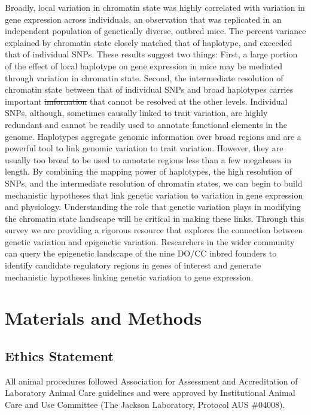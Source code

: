 \documentclass[
  11pt,
]{article}
\providecommand{\DIFaddtex}[1]{{\protect\color{blue}\uwave{#1}}} %
\providecommand{\DIFdeltex}[1]{{\protect\color{red}\sout{#1}}}                      %
\providecommand{\DIFaddbegin}{} %
\providecommand{\DIFaddend}{} %
\providecommand{\DIFdelbegin}{} %
\providecommand{\DIFdelend}{} %
\providecommand{\DIFadd}[1]{\texorpdfstring{\DIFaddtex{#1}}{#1}} %
\providecommand{\DIFdel}[1]{\texorpdfstring{\DIFdeltex{#1}}{}} %
\newcommand{\DIFscaledelfig}{0.5}
\newlength{\DIFdelgraphicswidth} %
\newlength{\DIFdelgraphicsheight} %
\newcommand{\DIFaddincludegraphics}[2][]{{\color{blue}\fbox{\DIFOincludegraphics[#1]{#2}}}} %
\newcommand{\DIFdelincludegraphics}[2][]{%
\sbox{\DIFdelgraphicsbox}{\DIFOincludegraphics[#1]{#2}}%
\settoboxwidth{\DIFdelgraphicswidth}{\DIFdelgraphicsbox} %
\settoboxtotalheight{\DIFdelgraphicsheight}{\DIFdelgraphicsbox} %
\scalebox{\DIFscaledelfig}{%
\parbox[b]{\DIFdelgraphicswidth}{\usebox{\DIFdelgraphicsbox}\\[-\baselineskip] \rule{\DIFdelgraphicswidth}{0em}}\llap{\resizebox{\DIFdelgraphicswidth}{\DIFdelgraphicsheight}{%
\setlength{\unitlength}{\DIFdelgraphicswidth}%
\begin{picture}(1,1)%
\thicklines\linethickness{2pt} %
{\color[rgb]{1,0,0}\put(0,0){\framebox(1,1){}}}%
{\color[rgb]{1,0,0}\put(0,0){\line( 1,1){1}}}%
{\color[rgb]{1,0,0}\put(0,1){\line(1,-1){1}}}%
\end{picture}%
}\hspace*{3pt}}} %
} %
\DeclareRobustCommand{\DIFaddbegin}{\DIFOaddbegin \let\includegraphics\DIFaddincludegraphics} %
\DeclareRobustCommand{\DIFaddend}{\DIFOaddend \let\includegraphics\DIFOincludegraphics} %
\DeclareRobustCommand{\DIFdelbegin}{\DIFOdelbegin \let\includegraphics\DIFdelincludegraphics} %
\DeclareRobustCommand{\DIFdelend}{\DIFOaddend \let\includegraphics\DIFOincludegraphics} %
\begin{document}
Broadly, local variation in chromatin state was highly correlated with
variation in gene expression across individuals, an observation that was
replicated in an independent population of genetically diverse, outbred
mice. The percent variance explained by chromatin state closely matched
that of haplotype, and exceeded that of individual SNPs. These results
suggest two things: First, a large portion of the effect of local
haplotype on gene expression in mice may be mediated through variation
in chromatin state. Second, the intermediate resolution of chromatin
state between that of individual SNPs and broad haplotypes carries
important \DIFdelbegin \DIFdel{imfornation }\DIFdelend \DIFaddbegin \DIFadd{infornation }\DIFaddend that cannot be resolved at the other levels.
Individual SNPs, although, sometimes causally linked to trait variation,
are highly redundant and cannot be readily used to annotate functional
elements in the genome. Haplotypes aggregate genomic information over
broad regions and are a powerful tool to link genomic variation to trait
variation. However, they are usually too broad to be used to annotate
regions less than a few megabases in length. By combining the mapping
power of haplotypes, the high resolution of SNPs, and the intermediate
resolution of chromatin states, we can begin to build mechanistic
hypotheses that link genetic variation to variation in gene expression
and physiology. Understanding the role that genetic variation plays in
modifying the chromatin state landscape will be critical in making these
links. Through this survey we are providing a rigorous resource that
explores the connection between genetic variation and epigenetic
variation. Researchers in the wider community can query the epigenetic
landscape of the nine DO/CC inbred founders to identify candidate
regulatory regions in genes of interest and generate mechanistic
hypotheses linking genetic variation to gene expression.

\hypertarget{materials-and-methods}{%
\section{Materials and Methods}\label{materials-and-methods}}

\hypertarget{ethics-statement}{%
\subsection{Ethics Statement}\label{ethics-statement}}

All animal procedures followed Association for Assessment and
Accreditation of Laboratory Animal Care guidelines and were approved by
Institutional Animal Care and Use Committee (The Jackson Laboratory,
Protocol AUS \#04008).
\end{document}
